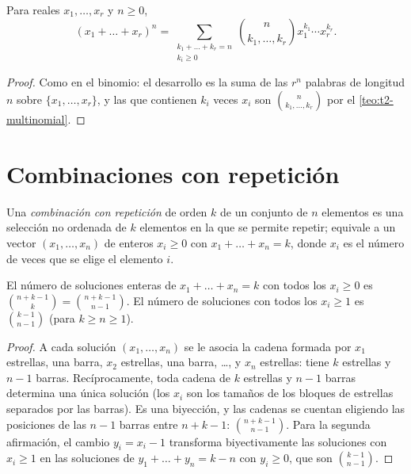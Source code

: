 \begin{teorema}\label{teo:t2-multinomio}
Para reales $x_1,\dots,x_r$ y $n\ge0$,
\[
(x_1+\dots+x_r)^{n}=\sum_{\substack{k_1+\dots+k_r=n\\ k_i\ge0}}\binom{n}{k_1,\dots,k_r}x_1^{k_1}\cdots x_r^{k_r}.
\]
\end{teorema}

\begin{proof}
Como en el binomio: el desarrollo es la suma de las $r^{n}$ palabras de longitud $n$ sobre $\{x_1,\dots,x_r\}$, y las que contienen $k_i$ veces $x_i$ son $\binom{n}{k_1,\dots,k_r}$ por el \cref{teo:t2-multinomial}.
\end{proof}

\section{Combinaciones con repetición}

\begin{definicion}
Una \emph{combinación con repetición} de orden $k$ de un conjunto de $n$ elementos es una selección no ordenada de $k$ elementos en la que se permite repetir; equivale a un vector $(x_1,\dots,x_n)$ de enteros $x_i\ge 0$ con $x_1+\dots+x_n=k$, donde $x_i$ es el número de veces que se elige el elemento $i$.
\end{definicion}

\begin{teorema}\label{teo:t2-estrellas}
El número de soluciones enteras de $x_1+\dots+x_n=k$ con todos los $x_i\ge0$ es $\binom{n+k-1}{k}=\binom{n+k-1}{n-1}$. El número de soluciones con todos los $x_i\ge1$ es $\binom{k-1}{n-1}$ (para $k\ge n\ge 1$).
\end{teorema}

\begin{proof}
A cada solución $(x_1,\dots,x_n)$ se le asocia la cadena formada por $x_1$ estrellas, una barra, $x_2$ estrellas, una barra, \dots, y $x_n$ estrellas: tiene $k$ estrellas y $n-1$ barras. Recíprocamente, toda cadena de $k$ estrellas y $n-1$ barras determina una única solución (los $x_i$ son los tamaños de los bloques de estrellas separados por las barras). Es una biyección, y las cadenas se cuentan eligiendo las posiciones de las $n-1$ barras entre $n+k-1$: $\binom{n+k-1}{n-1}$. Para la segunda afirmación, el cambio $y_i=x_i-1$ transforma biyectivamente las soluciones con $x_i\ge1$ en las soluciones de $y_1+\dots+y_n=k-n$ con $y_i\ge0$, que son $\binom{k-1}{n-1}$.
\end{proof}

